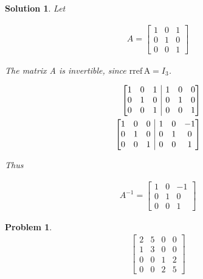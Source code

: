 \documentclass{article}
\newtheorem{problem}{Problem}
\newtheorem*{solution}{Solution}
\newcommand{\rref}[1]{\mathrm{rref \, #1}}
\begin{document}
\begin{solution}
Let

\begin{align*}
A = \begin{bmatrix}
1 & 0 & 1 \\
0 & 1 & 0 \\
0 & 0 & 1
\end{bmatrix}
\end{align*}

The matrix A is invertible, since $\rref{A} = I_{3}$. 

\begin{align*}
\left[ \begin{array}{@{}ccc|ccc@{}}
1 & 0 & 1 & 1 & 0 & 0 \\
0 & 1 & 0 & 0 & 1 & 0 \\
0 & 0 & 1 & 0 & 0 & 1
\end{array} \right] \\
\left[ \begin{array}{@{}ccc|ccc@{}}
1 & 0 & 0 & 1 & 0 & -1 \\
0 & 1 & 0 & 0 & 1 & 0 \\
0 & 0 & 1 & 0 & 0 & 1
\end{array} \right]
\end{align*}

Thus 

\begin{align*}
A^{-1} = \begin{bmatrix}
1 & 0 & -1 \\
0 & 1 & 0 \\
0 & 0 & 1
\end{bmatrix}
\end{align*}

\end{solution}

\begin{problem}
\begin{align*}
\begin{bmatrix}
2 & 5 & 0 & 0 \\
1 & 3 & 0 & 0 \\
0 & 0 & 1 & 2 \\
0 & 0 & 2 & 5
\end{bmatrix}
\end{align*}
\end{problem}
\end{document}
